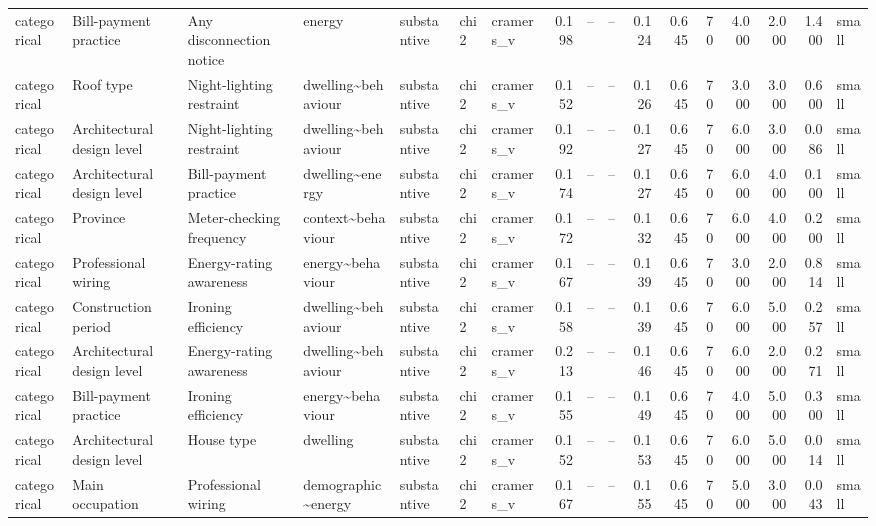 \begin{table}
\begin{tabular}{lllllllrrrrrrrrrl}
categorical & Bill-payment practice & Any disconnection notice & energy & substantive & chi2 & cramers\_v & 0.198 & -- & -- & 0.124 & 0.645 & 70 & 4.000 & 2.000 & 1.400 & small \\
categorical & Roof type & Night-lighting restraint & dwelling\textasciitilde behaviour & substantive & chi2 & cramers\_v & 0.152 & -- & -- & 0.126 & 0.645 & 70 & 3.000 & 3.000 & 0.600 & small \\
categorical & Architectural design level & Night-lighting restraint & dwelling\textasciitilde behaviour & substantive & chi2 & cramers\_v & 0.192 & -- & -- & 0.127 & 0.645 & 70 & 6.000 & 3.000 & 0.086 & small \\
categorical & Architectural design level & Bill-payment practice & dwelling\textasciitilde energy & substantive & chi2 & cramers\_v & 0.174 & -- & -- & 0.127 & 0.645 & 70 & 6.000 & 4.000 & 0.100 & small \\
categorical & Province & Meter-checking frequency & context\textasciitilde behaviour & substantive & chi2 & cramers\_v & 0.172 & -- & -- & 0.132 & 0.645 & 70 & 6.000 & 4.000 & 0.200 & small \\
categorical & Professional wiring & Energy-rating awareness & energy\textasciitilde behaviour & substantive & chi2 & cramers\_v & 0.167 & -- & -- & 0.139 & 0.645 & 70 & 3.000 & 2.000 & 0.814 & small \\
categorical & Construction period & Ironing efficiency & dwelling\textasciitilde behaviour & substantive & chi2 & cramers\_v & 0.158 & -- & -- & 0.139 & 0.645 & 70 & 6.000 & 5.000 & 0.257 & small \\
categorical & Architectural design level & Energy-rating awareness & dwelling\textasciitilde behaviour & substantive & chi2 & cramers\_v & 0.213 & -- & -- & 0.146 & 0.645 & 70 & 6.000 & 2.000 & 0.271 & small \\
categorical & Bill-payment practice & Ironing efficiency & energy\textasciitilde behaviour & substantive & chi2 & cramers\_v & 0.155 & -- & -- & 0.149 & 0.645 & 70 & 4.000 & 5.000 & 0.300 & small \\
categorical & Architectural design level & House type & dwelling & substantive & chi2 & cramers\_v & 0.152 & -- & -- & 0.153 & 0.645 & 70 & 6.000 & 5.000 & 0.014 & small \\
categorical & Main occupation & Professional wiring & demographic\textasciitilde energy & substantive & chi2 & cramers\_v & 0.167 & -- & -- & 0.155 & 0.645 & 70 & 5.000 & 3.000 & 0.043 & small \\

\end{tabular}
\end{table}
